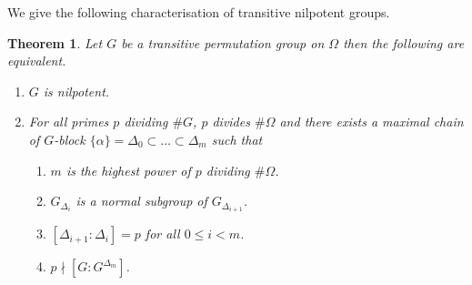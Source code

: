 \documentclass[11pt]{madras}%
\newtheorem{theorem}{Theorem}[chapter]
\theoremstyle{remark}
\begin{document}
We give the following characterisation of transitive nilpotent groups.

\begin{theorem}\label{thm-nilpotent-main-theorem}
  Let $G$ be a transitive permutation group on $\Omega$ then the
  following are equivalent.
  \begin{enumerate}
  \item $G$ is nilpotent.
  \item For all primes $p$ dividing $\# G$, $p$ divides $\# \Omega$
    and there exists a maximal chain of $G$-block $\{ \alpha \} =
    \Delta_0 \subset \ldots \subset \Delta_m$ such that
    \begin{enumerate}
    \item $m$ is the highest power of $p$ dividing $\# \Omega$.
      \label{cond-start}%
    \item $G_{\Delta_i}$ is a normal subgroup of $G_{\Delta_{i+1}}$.
    \item $[\Delta_{i+1} : \Delta_i] = p$ for all $0 \leq i < m$.
    \item $p \nmid [G : G^{\Delta_m}]$. %
      \label{cond-end}%
    \end{enumerate}
  \end{enumerate}
\end{theorem}
\end{document}
